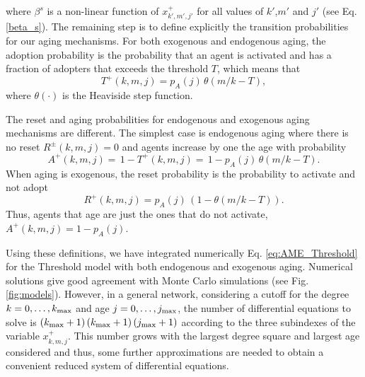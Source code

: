 where $\beta^s$ is a non-linear function of $x^{+}_{k',m',j'}$ for all values of $k'$,$m'$ and $j'$  (see Eq. \eqref{beta_s}). The remaining step is to define explicitly the transition probabilities for our aging mechanisms. For both exogenous and endogenous aging, the adoption probability is the probability that an agent is activated and has a fraction of adopters that exceeds the threshold $T$, which means that 
\begin{equation}
T^{+}(k,m,j) = p_A(j) \, \theta(m/k - T),
\end{equation} 
where $\theta(\cdot)$ is the Heaviside step function. 

The reset and aging probabilities for endogenous and exogenous aging mechanisms are different. The simplest case is endogenous aging where there is no reset $R^{\pm} (k,m,j) = 0$ and agents increase by one the age with probability 
\begin{equation}
A^{+} (k,m,j) = \,  1 - T^{+}(k,m,j) = \, 1 - p_{A}(j)\, \theta \left( m/k - T \right).
\end{equation}
When aging is exogenous, the reset probability is the probability to activate and not adopt 
\begin{equation}
R^{+} (k,m,j) = p_A (j)\, \left(1 - \theta \left(m/k - T\right)\right). 
\end{equation}
Thus, agents that age are just the ones that do not activate, $A^{+} (k,m,j) = 1 - p_A(j)$.

Using these definitions, we have integrated numerically Eq. \eqref{eq:AME_Threshold} for the Threshold model with both endogenous and exogenous aging. Numerical solutions give  good agreement with Monte Carlo simulations (see Fig. \ref{fig:models}). However, in a general network, considering a cutoff for the degree $k = 0,\dots,k_{\rm{max}}$ and age $j = 0,\dots,j_{\rm{max}}$, the number of differential equations to solve is $(k_{\rm{max}} + 1)\, (k_{\rm{max}} + 1)\, (j_{\rm{max}} + 1)$ according to the three subindexes of the variable $x^{+}_{k,m,j}$. This number grows with the largest degree square and largest age considered and thus, some further approximations are needed to obtain a convenient reduced system of differential equations. 

